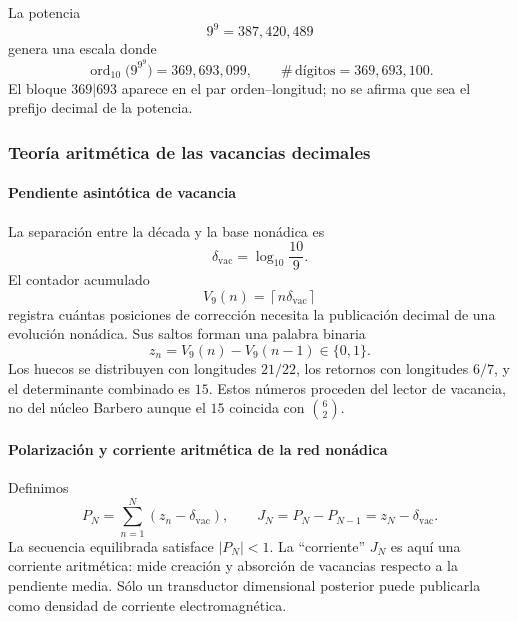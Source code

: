 La potencia
\[
9^9=387,420,489
\]
genera una escala donde
\begin{equation}
\operatorname{ord}_{10}\bigl(9^{9^9}\bigr)=369,693,099,
\qquad
\#\,\text{dígitos}=369,693,100.
\label{eq:369693}
\end{equation}
El bloque \(369|693\) aparece en el par orden--longitud; no se afirma que sea
el prefijo decimal de la potencia.

\subsubsection{Teoría aritmética de las vacancias decimales}

\paragraph{Pendiente asintótica de vacancia}

La separación entre la década y la base nonádica es
\begin{equation}
\delta_{\mathrm{vac}}=\log_{10}\frac{10}{9}.
\label{eq:delta-vac}
\end{equation}
El contador acumulado
\begin{equation}
V_9(n)=\left\lceil n\delta_{\mathrm{vac}}\right\rceil
\label{eq:vacancy-count}
\end{equation}
registra cuántas posiciones de corrección necesita la publicación decimal de
una evolución nonádica. Sus saltos forman una palabra binaria
\[
z_n=V_9(n)-V_9(n-1)\in\{0,1\}.
\]
Los huecos se distribuyen con longitudes \(21/22\), los retornos con
longitudes \(6/7\), y el determinante combinado es \(15\). Estos números
proceden del lector de vacancia, no del núcleo Barbero aunque el \(15\)
coincida con \(\binom62\).

\paragraph{Polarización y corriente aritmética de la red nonádica}

Definimos
\begin{equation}
P_N=\sum_{n=1}^N(z_n-\delta_{\mathrm{vac}}),
\qquad
J_N=P_N-P_{N-1}=z_N-\delta_{\mathrm{vac}}.
\label{eq:arith-current}
\end{equation}
La secuencia equilibrada satisface \(|P_N|<1\). La \enquote{corriente}
\(J_N\) es aquí una corriente aritmética: mide creación y absorción de
vacancias respecto a la pendiente media. Sólo un transductor dimensional
posterior puede publicarla como densidad de corriente electromagnética.

